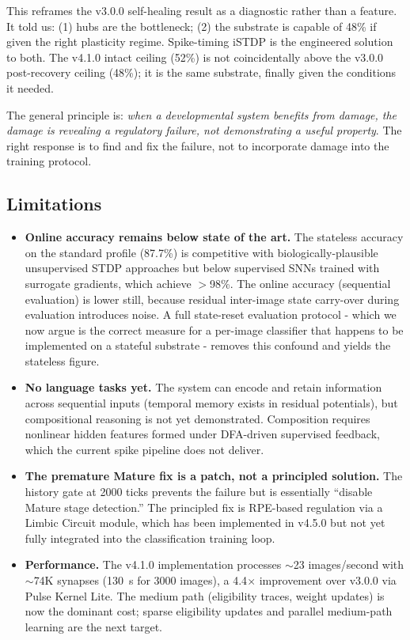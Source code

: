 This reframes the v3.0.0 self-healing result as a diagnostic rather than a feature. It told us: (1) hubs are the bottleneck; (2) the substrate is capable of 48\% if given the right plasticity regime. Spike-timing iSTDP is the engineered solution to both. The v4.1.0 intact ceiling (52\%) is not coincidentally above the v3.0.0 post-recovery ceiling (48\%); it is the same substrate, finally given the conditions it needed.

The general principle is: \emph{when a developmental system benefits from damage, the damage is revealing a regulatory failure, not demonstrating a useful property}. The right response is to find and fix the failure, not to incorporate damage into the training protocol.

\subsection{Limitations}

\begin{itemize}
  \item \textbf{Online accuracy remains below state of the art.} The stateless accuracy on the standard profile (87.7\%) is competitive with biologically-plausible unsupervised STDP approaches \cite{diehl2015unsupervised} but below supervised SNNs trained with surrogate gradients, which achieve $>$98\%. The online accuracy (sequential evaluation) is lower still, because residual inter-image state carry-over during evaluation introduces noise. A full state-reset evaluation protocol - which we now argue is the correct measure for a per-image classifier that happens to be implemented on a stateful substrate - removes this confound and yields the stateless figure.
  \item \textbf{No language tasks yet.} The system can encode and retain information across sequential inputs (temporal memory exists in residual potentials), but compositional reasoning is not yet demonstrated. Composition requires nonlinear hidden features formed under DFA-driven supervised feedback, which the current spike pipeline does not deliver.
  \item \textbf{The premature Mature fix is a patch, not a principled solution.} The history gate at 2000 ticks prevents the failure but is essentially ``disable Mature stage detection.'' The principled fix is RPE-based regulation via a Limbic Circuit module, which has been implemented in v4.5.0 but not yet fully integrated into the classification training loop.
  \item \textbf{Performance.} The v4.1.0 implementation processes $\sim$23 images/second with $\sim$74K synapses (130~s for 3000 images), a 4.4$\times$ improvement over v3.0.0 via Pulse Kernel Lite. The medium path (eligibility traces, weight updates) is now the dominant cost; sparse eligibility updates and parallel medium-path learning are the next target.
\end{itemize}

